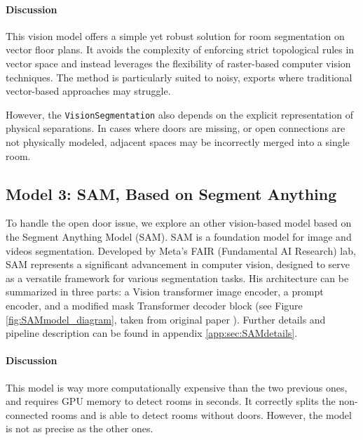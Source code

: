 \documentclass[11pt]{article}
\begin{document}
\paragraph{Discussion}
This vision model offers a simple yet robust solution for room segmentation on 
vector floor plans. It avoids the complexity of enforcing strict topological 
rules in vector space and instead leverages the flexibility of raster-based computer 
vision techniques. The method is particularly suited to noisy, exports where 
traditional vector-based approaches may struggle.

However, the \texttt{VisionSegmentation} also depends on the explicit representation of physical separations. 
In cases where doors are missing, or open connections are not physically modeled, 
adjacent spaces may be incorrectly merged into a single room.


\subsection{Model 3: SAM, Based on Segment Anything}
To handle the open door issue, we explore an other vision-based model 
based on the Segment Anything Model 
(SAM)\cite{kirillov2023segment}. SAM is a foundation model for image and videos segmentation. Developed by 
Meta's FAIR (Fundamental AI Research) lab, SAM represents a significant advancement 
in computer vision, designed to serve as a versatile framework for various 
segmentation tasks. His architecture can be summarized in three parts: a Vision 
transformer image encoder, a prompt encoder, and a modified mask Transformer decoder
 block (see Figure \ref{fig:SAMmodel_diagram}, taken from original paper \cite{kirillov2023segment}).
 Further details and pipeline description 
 can be found in appendix \ref{app:sec:SAMdetails}. 

\paragraph{Discussion}
This model is way more computationally expensive than the two previous ones, 
and requires GPU memory to detect rooms in seconds. It correctly splits
the non-connected rooms and is able to detect rooms without doors.
However, the model is not as precise as the other ones.


\end{document}
